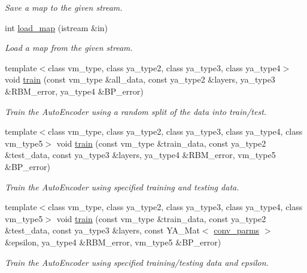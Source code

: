 \begin{CompactItemize}
\begin{CompactList}\small\item\em Save a map to the given stream. \item\end{CompactList}\item 
\hypertarget{class_y_a_a_t_e_reduce_a10}{
int \hyperlink{class_y_a_a_t_e_reduce_a10}{load\_\-map} (istream \&in)}
\label{class_y_a_a_t_e_reduce_a10}

\begin{CompactList}\small\item\em Load a map from the given stream. \item\end{CompactList}\item 
template$<$class vm\_\-type, class ya\_\-type2, class ya\_\-type3, class ya\_\-type4$>$ void \hyperlink{class_y_a_a_t_e_reduce_a11}{train} (const vm\_\-type \&all\_\-data, const ya\_\-type2 \&layers, ya\_\-type3 \&RBM\_\-error, ya\_\-type4 \&BP\_\-error)
\begin{CompactList}\small\item\em Train the Auto\-Encoder using a random split of the data into train/test. \item\end{CompactList}\item 
template$<$class vm\_\-type, class ya\_\-type2, class ya\_\-type3, class ya\_\-type4, class vm\_\-type5$>$ void \hyperlink{class_y_a_a_t_e_reduce_a12}{train} (const vm\_\-type \&train\_\-data, const ya\_\-type2 \&test\_\-data, const ya\_\-type3 \&layers, ya\_\-type4 \&RBM\_\-error, vm\_\-type5 \&BP\_\-error)
\begin{CompactList}\small\item\em Train the Auto\-Encoder using specified training and testing data. \item\end{CompactList}\item 
template$<$class vm\_\-type, class ya\_\-type2, class ya\_\-type3, class ya\_\-type4, class vm\_\-type5$>$ void \hyperlink{class_y_a_a_t_e_reduce_a13}{train} (const vm\_\-type \&train\_\-data, const ya\_\-type2 \&test\_\-data, const ya\_\-type3 \&layers, const YA\_\-Mat$<$ \hyperlink{struct_y_a_a_t_e_reduce_1_1conv__parms}{conv\_\-parms} $>$ \&epsilon, ya\_\-type4 \&RBM\_\-error, vm\_\-type5 \&BP\_\-error)
\begin{CompactList}\small\item\em Train the Auto\-Encoder using specified training/testing data and epsilon. \item\end{CompactList}\item 

\end{CompactItemize}
